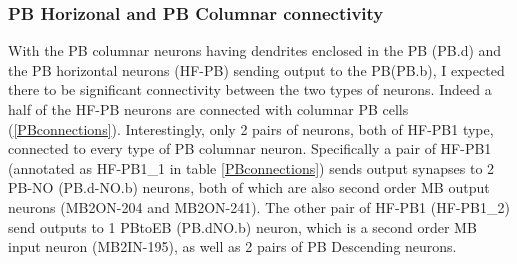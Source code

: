     \subsubsection{PB Horizonal and PB Columnar connectivity}
    With the PB columnar neurons having dendrites enclosed in the PB (PB.d) and the PB horizontal neurons (HF-PB) sending output to the PB(PB.b), I expected there to be significant connectivity between the two types of neurons. Indeed a half of the HF-PB neurons are connected with columnar PB cells (\ref{PBconnections}).  Interestingly, only 2 pairs of neurons, both of HF-PB1 type, connected to every type of PB columnar neuron. Specifically a pair of HF-PB1 (annotated as HF-PB1\_1 in table \ref{PBconnections}) sends output synapses to 2 PB-NO (PB.d-NO.b) neurons, both of which are also second order MB output neurons (MB2ON-204 and MB2ON-241). The other pair of  HF-PB1 (HF-PB1\_2) send outputs to 1 PBtoEB (PB.dNO.b) neuron, which is a second order MB input neuron (MB2IN-195), as well as 2 pairs of PB Descending neurons. 


